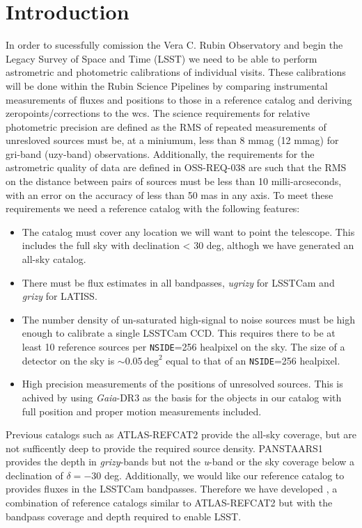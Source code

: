 \section{Introduction}
In order to sucessfully comission the Vera C. Rubin Observatory and begin the Legacy Survey of Space and Time (LSST) we need to be able to perform astrometric and photometric calibrations of individual visits. 
These calibrations will be done within the Rubin Science Pipelines by comparing instrumental measurements of fluxes and positions to those in a reference catalog and deriving zeropoints/corrections to the wcs. 
The science requirements for relative photometric precision \citep[OSS-REQ-0387;][]{LSE-30} are defined as the RMS of repeated measurements of unresloved sources must be, at a miniumum, less than 8 mmag (12 mmag) for gri-band (uzy-band) observations. 
Additionally, the requirements for the astrometric quality of data are defined in OSS-REQ-038 are such that the RMS on the distance between pairs of sources must be less than 10 milli-arcseconds, with an error on the accuracy of less than 50 mas in any axis. 
To meet these requirements we need a reference catalog with the following features:

\begin{itemize}
    \item The catalog must cover any location we will want to point the telescope. 
    This includes the full sky with declination < 30 deg, althogh we have generated an all-sky catalog. 
    \item There must be flux estimates in all bandpasses, \textit{ugrizy} for LSSTCam and \textit{grizy} for LATISS. 
    \item The number density of un-saturated high-signal to noise sources must be high enough to calibrate a single LSSTCam CCD. 
    This requires there to be at least 10 reference sources per \texttt{NSIDE}=256 healpixel on the sky.
    The size of a detector on the sky is $\sim 0.05\,\mathrm{deg}^2$  equal to that of an \texttt{NSIDE}=256 healpixel. 
    \item High precision measurements of the positions of unresolved sources. 
    This is achived by using \textit{Gaia}-DR3 as the basis for the objects in our catalog with full position and proper motion measurements included. 
    
\end{itemize} 

Previous catalogs such as ATLAS-REFCAT2 \citep{Tonry:2018} provide the all-sky coverage, but are not sufficently deep to provide the required source density. 
PANSTAARS1\citep[PS1;][]{Chambers:2016} provides the depth in \emph{grizy}-bands but not the \emph{u}-band or the sky coverage below a declination of $\delta = -30$ deg. 
Additionally, we would like our reference catalog to provides fluxes in the LSSTCam bandpasses. 
Therefore we have developed \monster, a combination of reference catalogs similar to ATLAS-REFCAT2 but with the bandpass coverage and depth required to enable LSST. 

